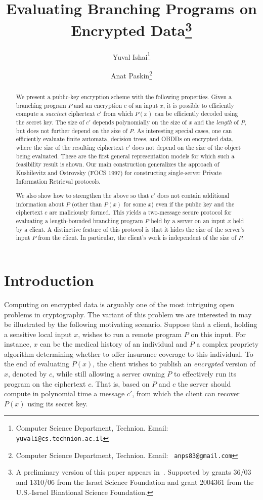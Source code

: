 \documentclass[11pt]{article}
\title{Evaluating Branching Programs on Encrypted Data\thanks{A
preliminary version of this paper appears in~\cite{IP07}. Supported
by grants 36/03 and 1310/06 from the Israel Science Foundation and
     grant 2004361 from the U.S.-Israel Binational Science
     Foundation.}}
\author{ Yuval Ishai\thanks{Computer Science Department, Technion.
Email: {\tt yuvali@cs.technion.ac.il}} \and Anat Paskin\thanks{
Computer Science Department, Technion. Email: {\tt
anps83@gmail.com}}}
\begin{document}
\maketitle
\begin{abstract}

We present a public-key encryption scheme with the following
properties. Given a branching program $P$ and an encryption $c$ of
an input $x$, it is possible to efficiently compute a {\em succinct}
ciphertext $c'$ from which $P(x)$ can be efficiently decoded using
the secret key. The size of $c'$ depends polynomially on the size of
$x$ and the {\em length} of $P$, but does not further depend on the
size of $P$. As interesting special cases, one can efficiently
evaluate finite automata, decision trees, and OBDDs on encrypted
data, where the size of the resulting ciphertext $c'$ does not
depend on the size of the object being evaluated. These are the
first general representation models for which such a feasibility
result is shown. Our main construction generalizes the approach of
Kushilevitz and Ostrovsky (FOCS 1997) for constructing single-server
Private Information Retrieval protocols.

We also show how to strengthen the above so that $c'$ does not
contain additional information about $P$ (other than $P(x)$ for some
$x$) even if the public key and the ciphertext $c$ are maliciously
formed. This yields a two-message secure protocol for evaluating a
length-bounded branching program $P$ held by a server on an input
$x$ held by a client. A distinctive feature of this protocol is that
it hides the size of the server's input $P$ from the client. In
particular, the client's work is independent of the size of $P$.


\end{abstract}



\section{Introduction}
Computing on encrypted data is arguably one of the most intriguing
open problems in cryptography. The variant of this problem we are
interested in may be illustrated by the following motivating
scenario. Suppose that a client, holding a sensitive local input
$x$, wishes to run a remote program $P$ on this input. For
instance, $x$ can be the medical history of an individual and $P$ a
complex propriety algorithm determining whether to offer insurance
coverage to this individual. To the end of evaluating $P(x)$, the
client wishes to publish an {\em encrypted} version of $x$, denoted
by $c$, while still allowing a server owning $P$ to effectively run
its program on the ciphertext $c$. That is, based on $P$ and $c$
the server should compute in polynomial time a message $c'$, from
which the client can recover $P(x)$ using its secret key.
\end{document}
